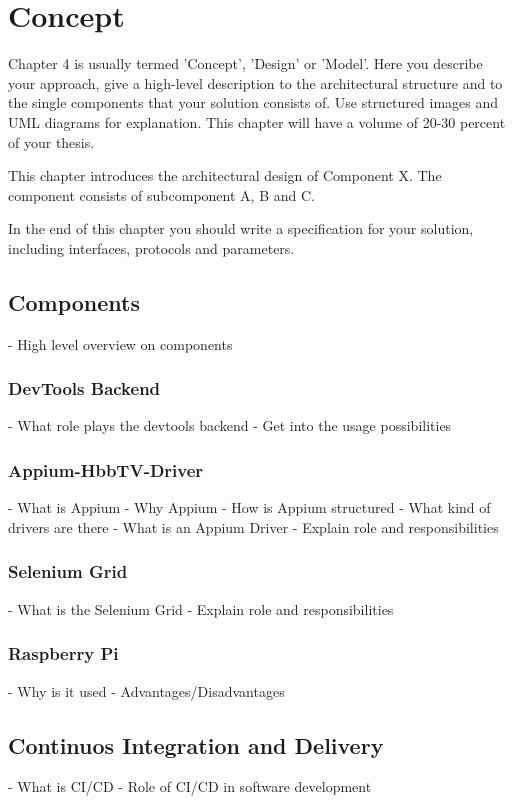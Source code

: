 \chapter{Concept\label{cha:concept}}

Chapter 4 is usually termed 'Concept', 'Design' or 'Model'. Here you describe your approach, give a
high-level description to the architectural structure and to the single components that your solution
consists of. Use structured images and UML diagrams for explanation. This chapter will have a volume
of 20-30 percent of your thesis.

This chapter introduces the architectural design of Component X. The component consists of
subcomponent A, B and C.

In the end of this chapter you should write a specification for your solution, including
interfaces, protocols and parameters.

\section{Components\label{sec:components}}

- High level overview on components

\subsection{DevTools Backend\label{sec:devtoolsbackend}}

- What role plays the devtools backend
- Get into the usage possibilities

\subsection{Appium-HbbTV-Driver\label{sec:appiumhbbtvdriver}}

- What is Appium
- Why Appium
- How is Appium structured
- What kind of drivers are there
- What is an Appium Driver
- Explain role and responsibilities

\subsection{Selenium Grid\label{sec:grid}}

- What is the Selenium Grid
- Explain role and responsibilities

\subsection{Raspberry Pi\label{sec:pi}}

- Why is it used
- Advantages/Disadvantages

\section{Continuos Integration and Delivery\label{sec:cicd}}

- What is CI/CD
- Role of CI/CD in software development
